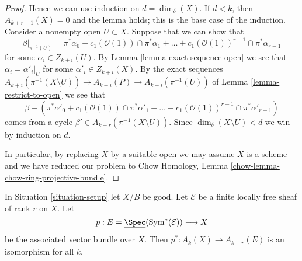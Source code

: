 \begin{proof}
\medskip\noindent
Hence we can use induction on $d = \dim_\delta(X)$.
If $d < k$, then $A_{k + r - 1}(X) = 0$ and the lemma holds;
this is the base case of the induction.
Consider a nonempty open $U \subset X$.
Suppose that we can show that
$$
\beta|_{\pi^{-1}(U)} =
\pi^*\alpha_0 +
c_1(\mathcal{O}(1)) \cap \pi^*\alpha_1 +
\ldots +
c_1(\mathcal{O}(1))^{r - 1} \cap \pi^*\alpha_{r - 1}
$$
for some $\alpha_i \in Z_{k + i}(U)$.
By Lemma \ref{lemma-exact-sequence-open} we see that
$\alpha_i = \alpha'_i|_U$ for some $\alpha'_i \in Z_{k + i}(X)$.
By the exact sequences
$A_{k + i}(\pi^{-1}(X \setminus U)) \to A_{k + i}(P) \to
A_{k + i}(\pi^{-1}(U))$
of Lemma \ref{lemma-restrict-to-open}
we see that
$$
\beta -
\left(\pi^*\alpha'_0 +
c_1(\mathcal{O}(1)) \cap \pi^*\alpha'_1 +
\ldots +
c_1(\mathcal{O}(1))^{r - 1} \cap \pi^*\alpha'_{r - 1}\right)
$$
comes from a cycle $\beta' \in A_{k + r}(\pi^{-1}(X \setminus U))$.
Since $\dim_\delta(X \setminus U) < d$ we win by
induction on $d$.

\medskip\noindent
In particular, by replacing $X$ by a suitable open we may assume
$X$ is a scheme and we have reduced our problem to
Chow Homology, Lemma \ref{chow-lemma-chow-ring-projective-bundle}.
\end{proof}

\begin{lemma}
\label{lemma-vectorbundle}
In Situation \ref{situation-setup} let $X/B$ be good.
Let $\mathcal{E}$ be a finite locally free sheaf of rank $r$ on $X$.
Let
$$
p :
E = \underline{\Spec}(\text{Sym}^*(\mathcal{E}))
\longrightarrow
X
$$
be the associated vector bundle over $X$.
Then $p^* : A_k(X) \to A_{k + r}(E)$ is an isomorphism for all $k$.
\end{lemma}

